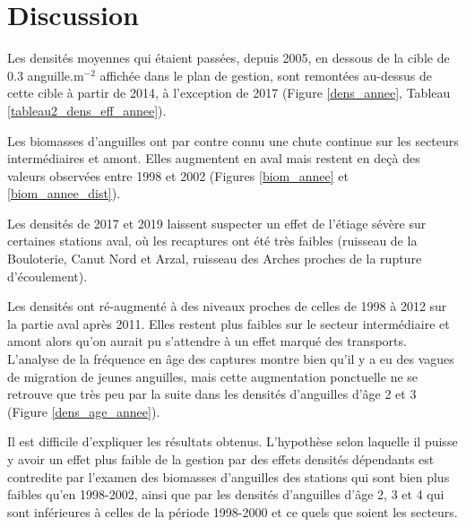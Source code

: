 \documentclass[10pt,twocolumn,titlepage,twoside]{article}\usepackage[]{graphicx}\usepackage[]{color}
\begin{document}
\section*{}


\section[Discussion]{ Discussion}

Les densités moyennes qui étaient passées, depuis 2005, en dessous de la cible
de 0.3 anguille.m$^{-2}$ affichée dans le plan de gestion, sont remontées
au-dessus de cette cible à partir de 2014, à l'exception de 2017 
(Figure \ref{dens_annee}, Tableau \ref{tableau2_dens_eff_annee}). 

Les biomasses d'anguilles ont par contre connu une chute
continue sur les secteurs intermédiaires et amont. Elles augmentent en aval mais
restent en deçà des valeurs observées entre 1998 et 2002 (Figures
\ref{biom_annee} et \ref{biom_annee_dist}).

Les densités de 2017 et 2019 laissent suspecter un effet de l'étiage sévère sur
certaines stations aval, où les recaptures ont été très faibles 
(ruisseau de la Bouloterie, Canut Nord et Arzal, ruisseau des
Arches proches de la rupture d'écoulement).

Les densités ont
ré-augmenté à des niveaux proches de celles de 1998 à 2012 sur la partie aval
après 2011. Elles restent plus faibles sur le secteur intermédiaire et amont
alors qu'on aurait pu s'attendre à un effet marqué des transports.
L'analyse de la fréquence en âge des captures montre bien qu'il y a eu des vagues de migration 
de jeunes anguilles, mais cette augmentation ponctuelle ne se retrouve que très
peu par la suite dans les densités d'anguilles d'âge 2 et 3 (Figure
\ref{dens_age_annee}).

Il est difficile d'expliquer les résultats obtenus. 
L'hypothèse selon laquelle il puisse y avoir un effet plus faible de la gestion 
par des effets densités dépendants est contredite par l'examen des biomasses d'anguilles
des stations qui sont bien plus faibles qu'en 1998-2002, ainsi que par les densités 
d'anguilles d'âge 2, 3 et 4 qui sont inférieures à celles de la période 1998-2000 et 
ce quels que soient les secteurs. 
\end{document}
